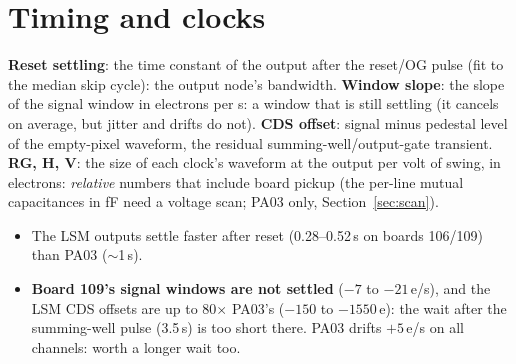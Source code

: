 \documentclass[10pt]{article}
\newcommand{\what}[1]{\par\colorbox{boxbg}{\parbox{\dimexpr\linewidth-2\fboxsep}{\small #1}}\par}
\begin{document}
\section{Timing and clocks}
\what{\textbf{Reset settling}: the time constant of the output after the reset/OG pulse (fit to the median skip cycle):
the output node's bandwidth. \textbf{Window slope}: the slope of the signal window in electrons per \textmu s: a window
that is still settling (it cancels on average, but jitter and drifts do not). \textbf{CDS offset}: signal minus pedestal
level of the empty-pixel waveform, the residual summing-well/output-gate transient. \textbf{RG, H, V}: the size of each
clock's waveform at the output per volt of swing, in electrons: \emph{relative} numbers that include board pickup (the
per-line mutual capacitances in fF need a voltage scan; PA03 only, Section~\ref{sec:scan}).}

\begin{itemize}[nosep]
\item The LSM outputs settle faster after reset (0.28--0.52\,\textmu s on boards 106/109) than PA03 ($\sim$1\,\textmu s).
\item \textbf{Board 109's signal windows are not settled} ($-7$ to $-21$\,e/\textmu s), and the LSM CDS offsets are up to
  80$\times$ PA03's ($-150$ to $-1550$\,e): the wait after the summing-well pulse (3.5\,\textmu s) is too short there.
  PA03 drifts $+5$\,e/\textmu s on all channels: worth a longer wait too.
\end{itemize}

\clearpage
\end{document}
